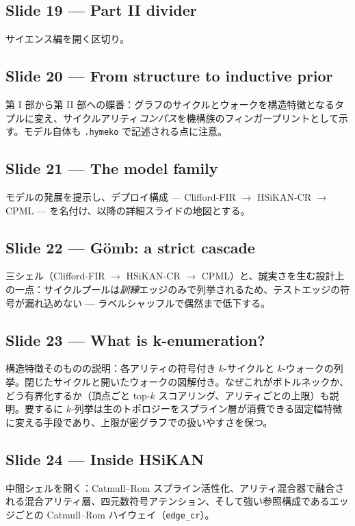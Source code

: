 \documentclass[10pt]{article}
\begin{document}
\subsection*{Slide 19 --- Part II divider}
サイエンス編を開く区切り。

\subsection*{Slide 20 --- From structure to inductive prior}
第 I 部から第 II 部への蝶番：グラフのサイクルとウォークを構造特徴となるタプルに変え、サイクルアリティ\emph{コンパス}を機構族のフィンガープリントとして示す。モデル自体も \texttt{.hymeko} で記述される点に注意。

\subsection*{Slide 21 --- The model family}
モデルの発展を提示し、デプロイ構成 --- Clifford-FIR $\to$ HSiKAN-CR $\to$ CPML --- を名付け、以降の詳細スライドの地図とする。

\subsection*{Slide 22 --- G\"omb: a strict cascade}
三シェル（Clifford-FIR $\to$ HSiKAN-CR $\to$ CPML）と、誠実さを生む設計上の一点：サイクルプールは\emph{訓練}エッジのみで列挙されるため、テストエッジの符号が漏れ込めない --- ラベルシャッフルで偶然まで低下する。

\subsection*{Slide 23 --- What is k-enumeration?}
構造特徴そのものの説明：各アリティの符号付き $k$-サイクルと $k$-ウォークの列挙。閉じたサイクルと開いたウォークの図解付き。なぜこれがボトルネックか、どう有界化するか（頂点ごと top-$k$ スコアリング、アリティごとの上限）も説明。要するに $k$-列挙は生のトポロジーをスプライン層が消費できる固定幅特徴に変える手段であり、上限が密グラフでの扱いやすさを保つ。

\subsection*{Slide 24 --- Inside HSiKAN}
中間シェルを開く：Catmull--Rom スプライン活性化、アリティ混合器で融合される混合アリティ層、四元数符号アテンション、そして強い参照構成であるエッジごとの Catmull--Rom ハイウェイ（\texttt{edge\_cr}）。
\end{document}
